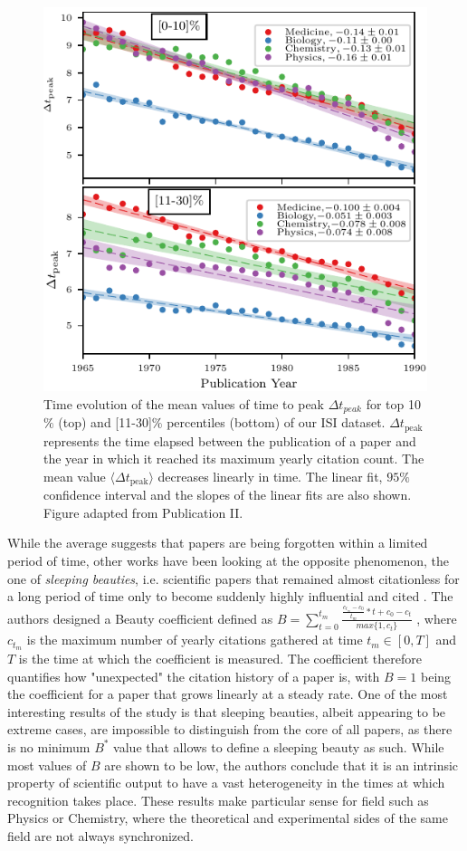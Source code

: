 \begin{figure}[htpb!]
\centering \large
\includegraphics[width=.8\linewidth]{Figures/Fields_Peak_stats_Mean.pdf}
\caption{ Time evolution of the mean values of time to peak $\Delta t_{{peak}}$ for top 10$\%$ (top) and [11-30]$\%$ percentiles (bottom) of our ISI dataset. $\Delta t_{\mathrm{peak}}$ 
represents the time elapsed between the publication of a paper and the year in which it reached its maximum yearly citation count.
The mean value $\langle \Delta t_{\mathrm{peak}} \rangle$ decreases linearly in time. The linear fit, $95\%$ confidence interval and the slopes of the linear fits are also shown. Figure adapted from Publication II.}

\label{fig:peak_decay}
\end{figure}

While the average suggests that papers are being forgotten within a limited period of time, other works have been looking at the opposite phenomenon, the one of \textit{sleeping beauties}, i.e.
scientific papers that remained almost citationless for a long period of time only to become suddenly highly influential and cited \cite{Ke16062015}. The authors designed a Beauty coefficient defined as
$B = \sum_{t = 0}^{t_{m}} \frac{\frac{c_{t_{m}}- c_{0}}{t_{m}} * t + c_{0} - c_{t}}{max \{1,c_{t}\}}$ , where $ c_{t_{m}}$ is the maximum number of yearly citations gathered at time $t_{m} \in [0, T]$ and $T$ is the time 
at which the coefficient is measured. The coefficient 
therefore quantifies how "unexpected" the citation history of a paper is, with $B=1$ being the coefficient for a paper that grows linearly at a steady rate. One of the most interesting results of the study is that
sleeping beauties, albeit appearing to be extreme cases, are impossible to distinguish from the core of all papers, as there is no minimum $B^{*}$ value that allows to define a sleeping beauty as such. While most 
values of $B$ are shown to be low, the authors conclude that it is an intrinsic property of scientific output to have a vast heterogeneity in the times at which recognition takes place. These results
make particular sense for field such as Physics or Chemistry, where the theoretical and experimental sides of the same field are not always synchronized. 

